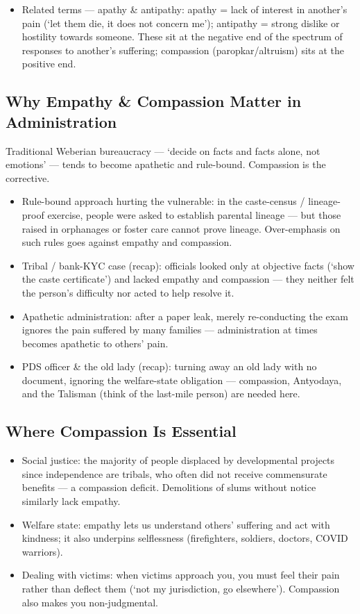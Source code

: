 \begin{itemize}
\item Related terms --- apathy \& antipathy: apathy = lack of interest in another's pain (`let them die, it does not concern me'); antipathy = strong dislike or hostility towards someone. These sit at the negative end of the spectrum of responses to another's suffering; compassion (paropkar/altruism) sits at the positive end.
\end{itemize}

\subsection{Why Empathy \& Compassion Matter in Administration}

Traditional Weberian bureaucracy --- `decide on facts and facts alone, not emotions' --- tends to become apathetic and rule-bound. Compassion is the corrective.

\begin{itemize}
\item Rule-bound approach hurting the vulnerable: in the caste-census / lineage-proof exercise, people were asked to establish parental lineage --- but those raised in orphanages or foster care cannot prove lineage. Over-emphasis on such rules goes against empathy and compassion.
\item Tribal / bank-KYC case (recap): officials looked only at objective facts (`show the caste certificate') and lacked empathy and compassion --- they neither felt the person's difficulty nor acted to help resolve it.
\item Apathetic administration: after a paper leak, merely re-conducting the exam ignores the pain suffered by many families --- administration at times becomes apathetic to others' pain.
\item PDS officer \& the old lady (recap): turning away an old lady with no document, ignoring the welfare-state obligation --- compassion, Antyodaya, and the Talisman (think of the last-mile person) are needed here.
\end{itemize}

\subsection{Where Compassion Is Essential}

\begin{itemize}
\item Social justice: the majority of people displaced by developmental projects since independence are tribals, who often did not receive commensurate benefits --- a compassion deficit. Demolitions of slums without notice similarly lack empathy.
\item Welfare state: empathy lets us understand others' suffering and act with kindness; it also underpins selflessness (firefighters, soldiers, doctors, COVID warriors).
\item Dealing with victims: when victims approach you, you must feel their pain rather than deflect them (`not my jurisdiction, go elsewhere'). Compassion also makes you non-judgmental.
\end{itemize}

